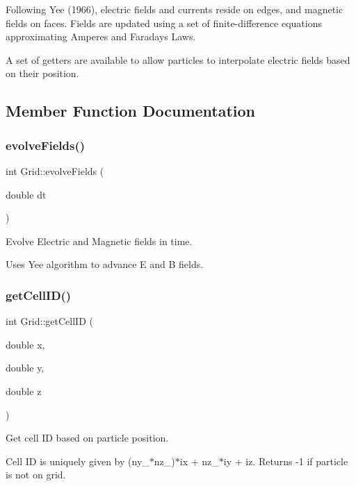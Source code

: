 Following Yee (1966), electric fields and currents reside on edges, and magnetic fields on faces. Fields are updated using a set of finite-\/difference equations approximating Ampere\textquotesingle{}s and Faraday\textquotesingle{}s Laws.

A set of getters are available to allow particles to interpolate electric fields based on their position. 

\subsection{Member Function Documentation}
\hypertarget{class_grid_ab1cc80fe3a856f09d59b51ef558764c3}{}\label{class_grid_ab1cc80fe3a856f09d59b51ef558764c3} 
\subsubsection{\texorpdfstring{evolve\+Fields()}{evolveFields()}}
{\footnotesize\ttfamily int Grid\+::evolve\+Fields (\begin{DoxyParamCaption}\item[{double}]{dt }\end{DoxyParamCaption})}



Evolve Electric and Magnetic fields in time. 

Uses Yee algorithm to advance E and B fields. \hypertarget{class_grid_a7347c885ddb7abbcc9390b6fec4ba42b}{}\label{class_grid_a7347c885ddb7abbcc9390b6fec4ba42b} 
\subsubsection{\texorpdfstring{get\+Cell\+I\+D()}{getCellID()}}
{\footnotesize\ttfamily int Grid\+::get\+Cell\+ID (\begin{DoxyParamCaption}\item[{double}]{x,  }\item[{double}]{y,  }\item[{double}]{z }\end{DoxyParamCaption})}



Get cell ID based on particle position. 

Cell ID is uniquely given by (ny\+\_\+$\ast$nz\+\_\+)$\ast$ix + nz\+\_\+$\ast$iy + iz. Returns -\/1 if particle is not on grid. \hypertarget{class_grid_a93ea3ff4d2e7bdc9b5c4cbe9fe604f76}{}\label{class_grid_a93ea3ff4d2e7bdc9b5c4cbe9fe604f76} 
